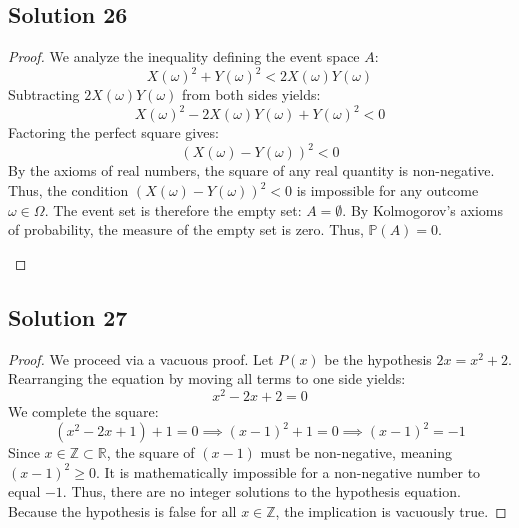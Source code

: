 \documentclass[12pt]{article}
\begin{document}
\subsection*{Solution 26}
\begin{proof}
We analyze the inequality defining the event space $A$:
\[ X(\omega)^2 + Y(\omega)^2 < 2X(\omega)Y(\omega) \]
Subtracting $2X(\omega)Y(\omega)$ from both sides yields:
\[ X(\omega)^2 - 2X(\omega)Y(\omega) + Y(\omega)^2 < 0 \]
Factoring the perfect square gives:
\[ (X(\omega) - Y(\omega))^2 < 0 \]
By the axioms of real numbers, the square of any real quantity is non-negative. Thus, the condition $(X(\omega) - Y(\omega))^2 < 0$ is impossible for any outcome $\omega \in \Omega$. The event set is therefore the empty set: $A = \emptyset$. By Kolmogorov's axioms of probability, the measure of the empty set is zero. Thus, $\mathbb{P}(A) = 0$.

\begin{center}
\end{center}
\end{proof}

\subsection*{Solution 27}
\begin{proof}
We proceed via a vacuous proof. Let $P(x)$ be the hypothesis $2x = x^2 + 2$. Rearranging the equation by moving all terms to one side yields:
\[ x^2 - 2x + 2 = 0 \]
We complete the square:
\[ (x^2 - 2x + 1) + 1 = 0 \implies (x - 1)^2 + 1 = 0 \implies (x - 1)^2 = -1 \]
Since $x \in \mathbb{Z} \subset \mathbb{R}$, the square of $(x-1)$ must be non-negative, meaning $(x-1)^2 \ge 0$. It is mathematically impossible for a non-negative number to equal $-1$. Thus, there are no integer solutions to the hypothesis equation. Because the hypothesis is false for all $x \in \mathbb{Z}$, the implication is vacuously true.
\end{proof}
\end{document}
